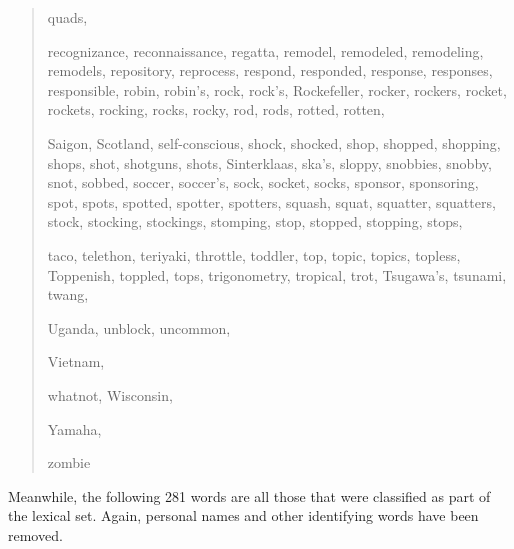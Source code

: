 \begin{quote}
    quads, 
    
    recognizance, reconnaissance, regatta, remodel, remodeled, remodeling, remodels, repository, reprocess, respond, responded, response, responses, responsible, robin, robin's, rock, rock's, Rockefeller, rocker, rockers, rocket, rockets, rocking, rocks, rocky, rod, rods, rotted, rotten, 
    
    Saigon, Scotland, self-conscious, shock, shocked, shop, shopped, shopping, shops, shot, shotguns, shots, Sinterklaas, ska's, sloppy, snobbies, snobby, snot, sobbed, soccer, soccer's, sock, socket, socks, sponsor, sponsoring, spot, spots, spotted, spotter, spotters, squash, squat, squatter, squatters, stock, stocking, stockings, stomping, stop, stopped, stopping, stops, 
    
    taco, telethon, teriyaki, throttle, toddler, top, topic, topics, topless, Toppenish, toppled, tops, trigonometry, tropical, trot, Tsugawa's, tsunami, twang, 
    
    Uganda, unblock, uncommon, 
    
    Vietnam, 
    
    whatnot, Wisconsin, 
    
    Yamaha, 
    
    zombie
\end{quote}

\noindent
Meanwhile, the following 281 words are all those that were classified as part of the \lot lexical set. Again, personal names and other identifying words have been removed.

